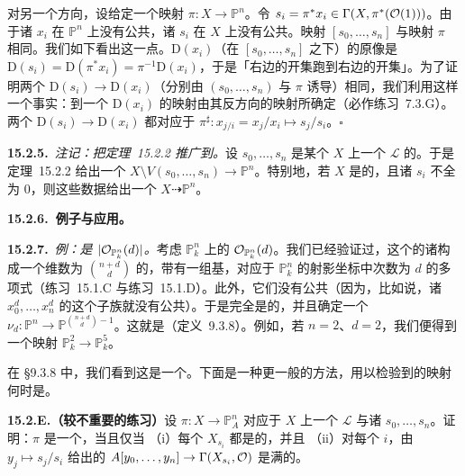 对另一个方向，设给定一个映射 $\pi\colon X\to\mathbb{P}^n$。令 $s_i=\pi^*x_i\in\Gamma(X,\pi^*(\mathcal{O}(1)))$。由于诸 $x_i$ 在 $\mathbb{P}^n$ 上没有公共\trZeros，诸 $s_i$ 在 $X$ 上没有公共\trZeros。映射 $[s_0,\dots,s_n]$ 与映射 $\pi$ 相同。我们如下看出这一点。$\mathrm{D}(x_i)$（在\trMorphism{} $[s_0,\dots,s_n]$ 之下）的原像是 $\mathrm{D}(s_i)=\mathrm{D}(\pi^*x_i)=\pi^{-1}\mathrm{D}(x_i)$，于是「右边的开集跑到右边的开集」。为了证明两个\trMorphism{} $\mathrm{D}(s_i)\to\mathrm{D}(x_i)$（分别由 $(s_0,\dots,s_n)$ 与 $\pi$ 诱导）相同，我们利用这样一个事实：到一个\trAffineScheme{} $\mathrm{D}(x_i)$ 的映射由其反方向的\trGlobalSections{}映射所确定（\mbox{必作练习~7.3.G}）。两个\trMorphism{} $\mathrm{D}(s_i)\to\mathrm{D}(x_i)$ 都对应于\trRingMorphism{} $\pi^{\sharp}\colon x_{j/i}=x_j/x_i\mapsto s_j/s_i$。\hfill$\square$

\textbf{15.2.5.}\ \emph{注记：把\mbox{定理~15.2.2} 推广到\trRationalMap。}\quad 设 $s_0,\dots,s_n$ 是某个\trScheme{} $X$ 上一个\trInvertibleSheaf{} $\mathscr{L}$ 的\trSection。于是\mbox{定理~15.2.2} 给出一个\trMorphism{} $X\setminus V(s_0,\dots,s_n)\to\mathbb{P}^n$。特别地，若 $X$ 是\trIntegral{}的，且诸 $s_i$ 不全为 $0$，则这些数据给出一个\trRationalMap{} $X\dashrightarrow\mathbb{P}^n$。

\textbf{15.2.6.\ 例子与应用。}

\textbf{15.2.7.}\ \emph{例：\trVeroneseEmbedding{}是 $|\mathcal{O}_{\mathbb{P}^n_k}(d)|$。}\quad 考虑 $\mathbb{P}^n_k$ 上的\trLineBundle{} $\mathcal{O}_{\mathbb{P}^n_k}(d)$。我们已经验证过，这个\trLineBundle{}的诸\trSection{}构成一个维数为 $\binom{n+d}{d}$ 的\trVectorSpace，带有一组基，对应于 $\mathbb{P}^n_k$ 的射影坐标中次数为 $d$ 的\trHomogeneous{}多项式（\mbox{练习~15.1.C} 与\mbox{练习~15.1.D}）。此外，它们没有公共\trZeros{}（因为，比如说，诸\trSection{} $x_0^d,\dots,x_n^d$ 的这个子族就没有公共\trZeros）。于是完全\trLinearSystem{}是\trBasePointFree{}的，并且确定一个\trMorphism{} $\nu_d\colon\mathbb{P}^n\to\mathbb{P}^{\binom{n+d}{d}-1}$。这就是\trVeroneseEmbedding（\mbox{定义~9.3.8}）。例如，若 $n=2$、$d=2$，我们便得到一个映射 $\mathbb{P}^2_k\to\mathbb{P}^5_k$。

在 \S9.3.8 中，我们看到这是一个\trClosedEmbedding。下面是一种更一般的方法，用以检验到\trProjectiveSpace{}的映射何时是\trClosedEmbedding。

\textbf{15.2.E.（较不重要的练习）}\quad 设 $\pi\colon X\to\mathbb{P}^n_A$ 对应于 $X$ 上一个\trInvertibleSheaf{} $\mathscr{L}$ 与诸\trSection{} $s_0,\dots,s_n$。证明：$\pi$ 是一个\trClosedEmbedding，当且仅当
（i）每个\trOpenSet{} $X_{s_i}$ 都是\trAffine{}的，并且
（ii）对每个 $i$，由 $y_j\mapsto s_j/s_i$ 给出的\trRingMorphism{} $A[y_0,\dots,y_n]\to\Gamma(X_{s_i},\mathcal{O})$ 是满的。

